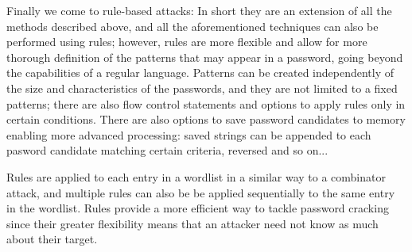 Finally we come to rule-based attacks: In short they are an extension of all the methods described above, and all the aforementioned techniques can also be performed using rules; however, rules are more flexible and allow for more thorough definition of the patterns that may appear in a password, going beyond the capabilities of a regular language.
Patterns can be created independently of the size and characteristics of the passwords, and they are not limited to a fixed patterns; there are also flow control statements and options to apply rules only in certain conditions.
There are also options to save password candidates to memory enabling more advanced processing: saved strings can be appended to each pasword candidate matching certain criteria, reversed and so on...

Rules are applied to each entry in a wordlist in a similar way to a combinator attack, and multiple rules can also be be applied sequentially to the same entry in the wordlist.
Rules provide a more efficient way to tackle password cracking since their greater flexibility means that an attacker need not know as much about their target. 


 

